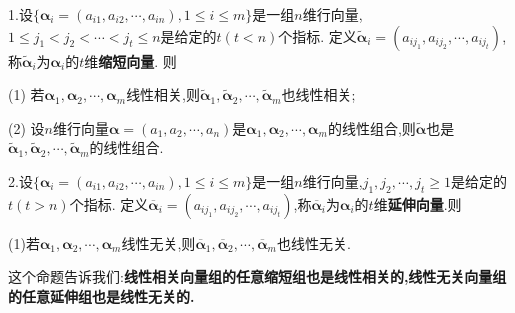 \documentclass[../../main.tex]{subfiles}
\begin{document}
\begin{proposition}[缩短向量与延伸向量]\label{proposition:线性相关向量组的缩短组也线性相关}
1.设\(\{\boldsymbol{\alpha}_i=(a_{i1},a_{i2},\cdots,a_{in}),1\leq i\leq m\}\)是一组\(n\)维行向量,\(1\leq j_1<j_2<\cdots<j_t\leq n\)是给定的\(t(t < n)\)个指标. 定义\(\widetilde{\boldsymbol{\alpha}}_i=(a_{ij_1},a_{ij_2},\cdots,a_{ij_t})\),称\(\widetilde{\boldsymbol{\alpha}}_i\)为\(\boldsymbol{\alpha}_i\)的\(t\)维\textbf{缩短向量}. 则

(1) 若\(\boldsymbol{\alpha}_1,\boldsymbol{\alpha}_2,\cdots,\boldsymbol{\alpha}_m\)线性相关,则\(\widetilde{\boldsymbol{\alpha}}_1,\widetilde{\boldsymbol{\alpha}}_2,\cdots,\widetilde{\boldsymbol{\alpha}}_m\)也线性相关;

(2) 设\(n\)维行向量\(\boldsymbol{\alpha}=(a_1,a_2,\cdots,a_n)\)是\(\boldsymbol{\alpha}_1,\boldsymbol{\alpha}_2,\cdots,\boldsymbol{\alpha}_m\)的线性组合,则\(\widetilde{\boldsymbol{\alpha}}\)也是\(\widetilde{\boldsymbol{\alpha}}_1,\widetilde{\boldsymbol{\alpha}}_2,\cdots,\widetilde{\boldsymbol{\alpha}}_m\)的线性组合.

2.设\(\{\boldsymbol{\alpha}_i=(a_{i1},a_{i2},\cdots,a_{in}),1\leq i\leq m\}\)是一组\(n\)维行向量,\(j_1,j_2,\cdots,j_t\geq 1\)是给定的\(t(t > n)\)个指标. 定义\(\overline{\boldsymbol{\alpha}}_i=(a_{ij_1},a_{ij_2},\cdots,a_{ij_t})\),称\(\overline{\boldsymbol{\alpha}}_i\)为\(\boldsymbol{\alpha}_i\)的\(t\)维\textbf{延伸向量}.则

(1)若\(\boldsymbol{\alpha}_1,\boldsymbol{\alpha}_2,\cdots,\boldsymbol{\alpha}_m\)线性无关,则\(\overline{\boldsymbol{\alpha}}_1,\overline{\boldsymbol{\alpha}}_2,\cdots,\overline{\boldsymbol{\alpha}}_m\)也线性无关.
\end{proposition}
\begin{note}
这个命题告诉我们:\textbf{线性相关向量组的任意缩短组也是线性相关的,线性无关向量组的任意延伸组也是线性无关的.}
\end{note}
\end{document}
